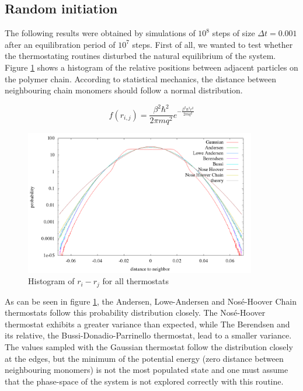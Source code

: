 % 
\graphicspath{{../graphics/}}


\subsection{Random initiation}
The following results were obtained by simulations of $10^8$ steps of size $\Delta t = 0.001$ after an equilibration period of $10^7$ steps. 
First of all, we wanted to test whether the thermostating routines disturbed the natural equilibrium of the system. Figure \ref{im:relPos_rand} shows a histogram of the relative positions between adjacent particles on the polymer chain. According to statistical mechanics, the distance between neighbouring chain monomers should follow a normal distribution.

\begin{equation}
f(r_{i,j}) = \frac{\beta^2\hbar^2}{2\pi mq^2}e^{-\frac{\beta^2\hbar^2r^2}{2mq^2}}
\end{equation}  

\begin{figure}[H]
\centering
\includegraphics[width=0.9\textwidth]{./graphics/Histogramm_relPos_rand_T=20_p=64.png}
\caption{Histogram of $r_i - r_j$ for all thermostats}
\label{im:relPos_rand}
\end{figure} 

As can be seen in figure \ref{im:relPos_rand}, the Andersen, Lowe-Andersen and Nosé-Hoover Chain thermostats follow this probability distribution closely. The Nosé-Hoover thermostat exhibits a greater variance than expected, while The Berendsen and its relative, the Bussi-Donadio-Parrinello thermostat,  lead to a smaller variance. The values sampled with the Gaussian thermostat follow the distribution closely at the edges, but the minimum of the potential energy (zero distance between neighbouring monomers) is not the most populated state and one must assume that the phase-space of the system is not explored correctly with this routine. 

